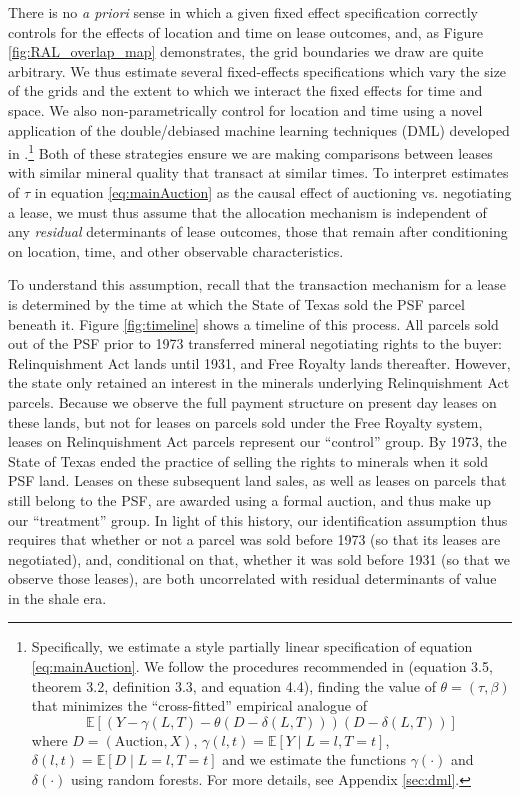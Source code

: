 \documentclass[12pt]{article}
\begin{document}
There is no \textit{a priori} sense in which a given fixed effect specification correctly controls for the effects of location and time on lease outcomes, and, as Figure \ref{fig:RAL_overlap_map} demonstrates, the grid boundaries we draw are quite arbitrary. We thus estimate several fixed-effects specifications which vary the size of the grids and the extent to which we interact the fixed effects for time and space. We also non-parametrically control for location and time using a novel application of the double/debiased machine learning techniques (DML) developed in \cite{chernozhukov2018double}.\footnote{Specifically, we estimate a \cite{robinson1988root} style partially linear specification of equation \ref{eq:mainAuction}.  We follow the procedures recommended in \cite{chernozhukov2018double} (equation 3.5, theorem 3.2, definition 3.3, and equation 4.4), finding the value of $\theta = (\tau, \beta)$ that minimizes the ``cross-fitted'' empirical analogue of 
\begin{equation*}
	\mathbb{E}\left[\left(Y - \gamma(L,T) - \theta(D - \delta(L, T))\right)\left(D - \delta(L,T)\right)\right]
\end{equation*}
where $D = (\text{Auction}, X)$, $\gamma(l,t) = \mathbb{E}\left[Y\mid L = l, T = t\right]$, $\delta(l,t) = \mathbb{E}\left[D\mid L = l, T = t\right]$ and we estimate the functions $\gamma(\cdot)$ and $\delta(\cdot)$ using random forests.  For more details, see Appendix \ref{sec:dml}.} Both of these strategies ensure we are making comparisons between leases with similar mineral quality that transact at similar times. To interpret estimates of $\tau$ in equation \ref{eq:mainAuction} as the causal effect of auctioning vs. negotiating a lease, we must thus assume that the allocation mechanism is independent of any \textit{residual} determinants of lease outcomes, those that remain after conditioning on location, time, and other observable characteristics. 

To understand this assumption, recall that the transaction mechanism for a lease is determined by the time at which the State of Texas sold the PSF parcel beneath it.  Figure \ref{fig:timeline} shows a timeline of this process. All parcels sold out of the PSF prior to 1973 transferred mineral negotiating rights to the buyer: Relinquishment Act lands until 1931, and Free Royalty lands thereafter. However, the state only retained an interest in the minerals underlying Relinquishment Act parcels. Because we observe the full payment structure on present day leases on these lands, but not for leases on parcels sold under the Free Royalty system, leases on Relinquishment Act parcels represent our ``control'' group.  By 1973, the State of Texas ended the practice of selling the rights to minerals when it sold PSF land. Leases on these subsequent land sales, as well as leases on parcels that still belong to the PSF, are awarded using a formal auction, and thus make up our ``treatment'' group.  In light of this history, our identification assumption thus requires that whether or not a parcel was sold before 1973 (so that its leases are negotiated), and, conditional on that, whether it was sold before 1931 (so that we observe those leases), are both uncorrelated with residual determinants of value in the shale era.
\end{document}
